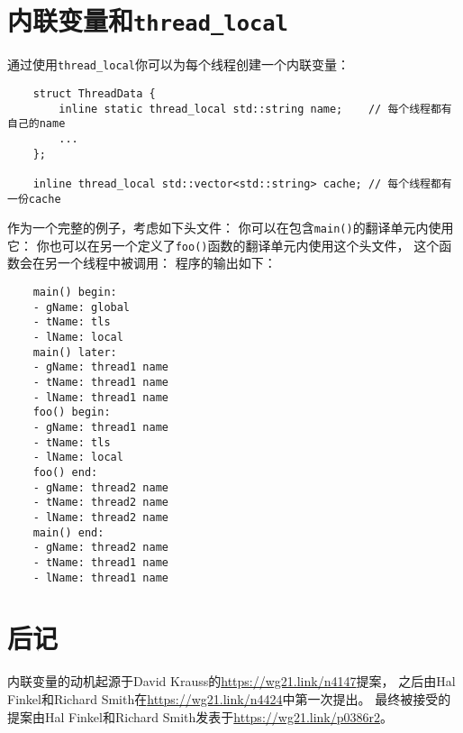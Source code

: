 \section{内联变量和\texttt{thread\_local}}
通过使用\texttt{thread\_local}你可以为每个线程创建一个内联变量：
\begin{lstlisting}
    struct ThreadData {
        inline static thread_local std::string name;    // 每个线程都有自己的name
        ...
    };

    inline thread_local std::vector<std::string> cache; // 每个线程都有一份cache
\end{lstlisting}
作为一个完整的例子，考虑如下头文件：
你可以在包含\texttt{main()}的翻译单元内使用它：
你也可以在另一个定义了\texttt{foo()}函数的翻译单元内使用这个头文件，
这个函数会在另一个线程中被调用：
程序的输出如下：
\begin{lstlisting}
    main() begin:
    - gName: global
    - tName: tls
    - lName: local
    main() later:
    - gName: thread1 name
    - tName: thread1 name
    - lName: thread1 name
    foo() begin:
    - gName: thread1 name
    - tName: tls
    - lName: local
    foo() end:
    - gName: thread2 name
    - tName: thread2 name
    - lName: thread2 name
    main() end:
    - gName: thread2 name
    - tName: thread1 name
    - lName: thread1 name
\end{lstlisting}

\section{后记}
内联变量的动机起源于David Krauss的\url{https://wg21.link/n4147}提案，
之后由Hal Finkel和Richard Smith在\url{https://wg21.link/n4424}中第一次提出。
最终被接受的提案由Hal Finkel和Richard Smith发表于\url{https://wg21.link/p0386r2}。
